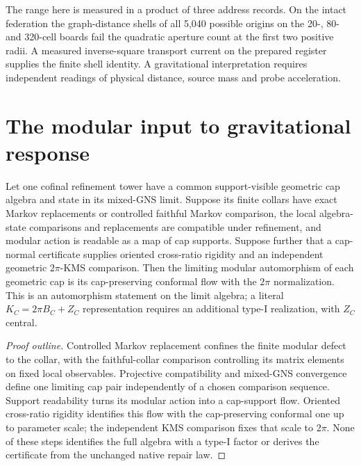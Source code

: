 \documentclass[11pt]{article}
\begin{document}
The range here is measured in a product of three address records.
On the intact federation the graph-distance shells of all 5,040
possible origins on the 20-, 80- and 320-cell boards fail the quadratic
aperture count at the first two positive radii. A measured inverse-square
transport current on the prepared register supplies the finite shell
identity. A gravitational interpretation requires independent readings
of physical distance, source mass and probe acceleration.

\tableofcontents
\clearpage

\def\OPHSkipStandardModelChain{1}
\def\OPHEinsteinDerivationPaper{1}
\def\OPHSkipEmbeddedReferences{1}



\section{The modular input to gravitational response}
\label{sec:modular-einstein-input}

\begin{theorem}
\label{thm:conditional-cap-modular}
Let one cofinal refinement tower have a common support-visible geometric
cap algebra and state in its mixed-GNS limit. Suppose its finite collars
have exact Markov replacements or controlled faithful Markov comparison,
the local algebra-state comparisons and replacements are compatible under
refinement, and modular action is readable as a map of cap supports.
Suppose further that a cap-normal certificate supplies oriented
cross-ratio rigidity and an independent geometric $2\pi$-KMS comparison.
Then the limiting modular automorphism of each geometric cap is its
cap-preserving conformal flow with the $2\pi$ normalization. This is an
automorphism statement on the limit algebra; a literal
$K_C=2\pi B_C+Z_C$ representation requires an additional type-I
realization, with $Z_C$ central.
\end{theorem}
\begin{proof}[Proof outline]
Controlled Markov replacement confines the finite modular defect to the
collar, with the faithful-collar comparison controlling its matrix elements
on fixed local observables. Projective compatibility and mixed-GNS
convergence define one limiting cap pair independently of a chosen
comparison sequence. Support readability turns its modular action into a
cap-support flow. Oriented cross-ratio rigidity identifies this flow with
the cap-preserving conformal one up to parameter scale; the independent
KMS comparison fixes that scale to $2\pi$. None of these steps identifies
the full algebra with a type-I factor or derives the certificate from the
unchanged native repair law.
\end{proof}
\end{document}
